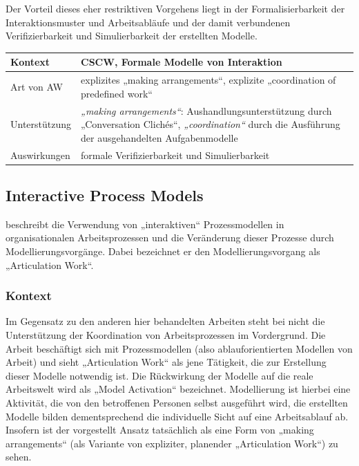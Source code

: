 Der Vorteil dieses eher restriktiven Vorgehens liegt in der Formalisierbarkeit der Interaktionsmuster und Arbeitsabläufe und der damit verbundenen Verifizierbarkeit und Simulierbarkeit der erstellten Modelle. 
\\[1em]
\begin{tabular}{| p{3cm} | p{10cm} |}
  \hline
  Kontext & \gls{CSCW}, Formale Modelle von Interaktion \\ \hline
  Art von AW & explizites „making arrangements“, explizite „coordination of predefined work“ \\ \hline
  Unterstützung & \emph{„making arrangements“}: Aushandlungsunterstützung durch „Conversation Clichés“, \emph{„coordination“} durch die Ausführung der ausgehandelten Aufgabenmodelle \\ \hline
  Auswirkungen & formale Verifizierbarkeit und Simulierbarkeit \\ \hline
\end{tabular}

\subsection{Interactive Process Models}
\label{sub:interactive_process_models}

\citet{Jorgensen04} beschreibt die Verwendung von „interaktiven“ Prozessmodellen in organisationalen Arbeitsprozessen und die Veränderung dieser Prozesse durch Modellierungsvorgänge. Dabei bezeichnet er den Modellierungsvorgang als „Articulation Work“.

\subsubsection{Kontext}

Im Gegensatz zu den anderen hier behandelten Arbeiten steht bei \citet{Jorgensen04} nicht die Unterstützung der Koordination von Arbeitsprozessen im Vordergrund. Die Arbeit beschäftigt sich mit Prozessmodellen (also ablauforientierten Modellen von Arbeit) und sieht „Articulation Work“ als jene Tätigkeit, die zur Erstellung dieser Modelle notwendig ist. Die Rückwirkung der Modelle auf die reale Arbeitswelt wird als „Model Activation“ bezeichnet. Modellierung ist hierbei eine Aktivität, die von den betroffenen Personen selbst ausgeführt wird, die erstellten Modelle bilden dementsprechend die individuelle Sicht auf eine Arbeitsablauf ab. Insofern ist der vorgestellt Ansatz tatsächlich als eine Form von „making arrangements“ (als Variante von expliziter, planender „Articulation Work“) zu sehen.


